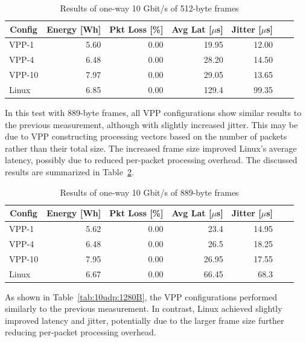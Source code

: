 \begin{table}[h!]
\centering
\caption{Results of one-way 10 Gbit/s of 512-byte frames}
\begin{tabular}{|l|r|r|r|r|r|r|}
\hline
\multicolumn{1}{|c|}{\textbf{Config}} &
\multicolumn{1}{c|}{\textbf{Energy [Wh] }} &
\multicolumn{1}{c|}{\textbf{Pkt Loss [\%]}} &
\multicolumn{1}{c|}{\textbf{Avg Lat [$\mu$s]}} &
\multicolumn{1}{c|}{\textbf{Jitter [$\mu$s]}} \\
\hline 
VPP-1 & 5.60 & 0.00 & 19.95 & 12.00 \\
VPP-4 & 6.48 & 0.00 & 28.20 & 14.50 \\
VPP-10 & 7.97 & 0.00 & 29.05 & 13.65 \\
Linux & 6.85 & 0.00 & 129.4 & 99.35 \\
\hline
\end{tabular}
\label{tab:10udp:512B}
\end{table}

In this test with 889-byte frames, all VPP configurations show similar results to the previous measurement, although with slightly increased jitter.
This may be due to VPP constructing processing vectors based on the number of packets rather than their total size.
The increased frame size improved Linux's average latency, possibly due to reduced per-packet processing overhead.
The discussed results are summarized in Table~\ref{tab:10udp:889B}.

\begin{table}[h!]
\centering
\caption{Results of one-way 10 Gbit/s of 889-byte frames}
\begin{tabular}{|l|r|r|r|r|r|r|}
\hline
\multicolumn{1}{|c|}{\textbf{Config}} &
\multicolumn{1}{c|}{\textbf{Energy [Wh] }} &
\multicolumn{1}{c|}{\textbf{Pkt Loss [\%]}} &
\multicolumn{1}{c|}{\textbf{Avg Lat [$\mu$s]}} &
\multicolumn{1}{c|}{\textbf{Jitter [$\mu$s]}} \\
\hline 
VPP-1 & 5.62 & 0.00 & 23.4 & 14.95 \\
VPP-4 & 6.48 & 0.00 & 26.5 & 18.25 \\
VPP-10 & 7.95 & 0.00 & 26.95 & 17.55 \\
Linux & 6.67 & 0.00 & 66.45 & 68.3 \\
\hline
\end{tabular}
\label{tab:10udp:889B}
\end{table}

As shown in Table~\ref{tab:10udp:1280B}, the VPP configurations performed similarly to the previous measurement.
In contrast, Linux achieved slightly improved latency and jitter, potentially due to the larger frame size further reducing per-packet processing overhead. 


